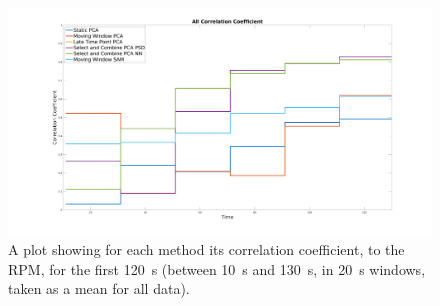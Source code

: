     \begin{figure}
        
        \centering
        
        \includegraphics[width=1.0\linewidth]{figures/all_correlation_coefficient_stairs.png}
        
        
        \vspace{-0.5cm}
        
        \captionsetup{singlelinecheck=false, justification=centering}
        \caption{
        \scriptsize
        A plot showing for each method its correlation coefficient, to the \gls{RPM}, for the first \SI{120}{\second} (between \SI{10}{\second} and \SI{130}{\second}, in \SI{20}{\second} windows, taken as a mean for all data).}
        
        \label{fig:all_cross_correlation}
        
        \vspace{-0.5cm}
    \end{figure}
    
    
    
        
